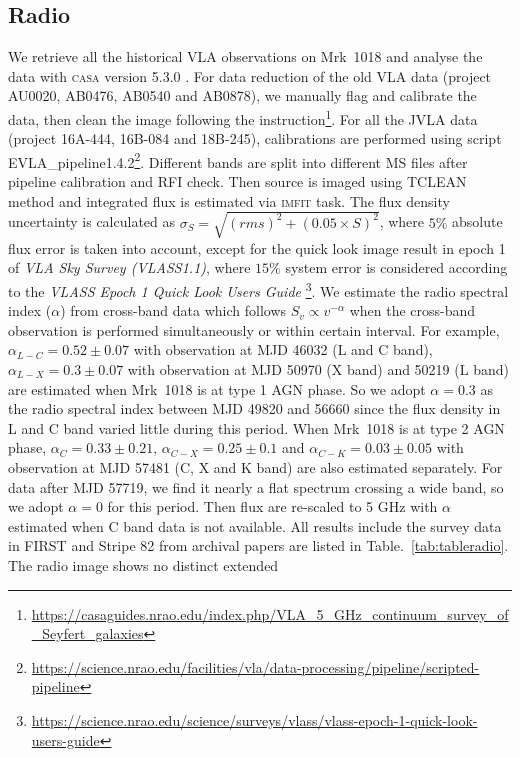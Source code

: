 \documentclass[twocolumn]{aastex63}
\begin{document}


\subsection{Radio}
\label{subsec:vla}
We retrieve all the historical VLA observations on Mrk~1018 and analyse the data with \textsc{casa} version 5.3.0 \citep{2007ASPC..376..127M}. For data reduction of the old VLA data (project AU0020, AB0476, AB0540 and AB0878), we manually flag and calibrate the data, then clean the image following the instruction\footnote{\url{https://casaguides.nrao.edu/index.php/VLA_5_GHz_continuum_survey_of_Seyfert_galaxies}}. For all the JVLA data (project 16A-444, 16B-084 and 18B-245), calibrations are performed using script {EVLA\_pipeline1.4.2}\footnote{\url{https://science.nrao.edu/facilities/vla/data-processing/pipeline/scripted-pipeline}}. Different bands are split into different MS files after pipeline calibration and RFI check. Then source is imaged using {\scriptsize TCLEAN} method and integrated flux is estimated via \textsc{imfit} task. The flux density uncertainty is calculated as $\sigma_{S}=\sqrt{(rms)^2+(0.05\times S)^2}$, where $5 \%$ absolute flux error is taken into account, except for the quick look image result in epoch 1 of  {\em VLA Sky Survey (VLASS1.1)}, where $15 \%$ system error is considered according to the {\em VLASS Epoch 1 Quick Look Users Guide} \footnote{\url{https://science.nrao.edu/science/surveys/vlass/vlass-epoch-1-quick-look-users-guide}}. We estimate the radio spectral index ($\alpha$) from cross-band data which follows $S_v \propto v^{-\alpha}$  when the cross-band observation is performed simultaneously or within certain interval. For example, $\alpha_{L-C} =0.52 \pm 0.07$ with observation at MJD 46032 (L and C band), $\alpha_{L-X} =0.3 \pm 0.07$ with observation at MJD 50970 (X band) and 50219 (L band) are estimated when Mrk~1018 is at type 1 AGN phase. So we adopt $\alpha=0.3$ as the radio spectral index between MJD 49820 and 56660 since the flux density in L and C band varied little during this period. When Mrk~1018 is at type 2 AGN phase, $\alpha_{C} =0.33\pm0.21$, $\alpha_{C-X} =0.25\pm0.1$ and $\alpha_{C-K} =0.03\pm0.05$ with observation at MJD 57481 (C, X and K band) are also estimated separately. For data after MJD 57719, we find it nearly a flat spectrum crossing a wide band, so we adopt $\alpha=0$ for this period. Then flux are re-scaled to 5 GHz with $\alpha$ estimated when C band data is not available.  All results include the survey data in FIRST\citep{1994ASPC...61..165B,1995ApJ...450..559B} and Stripe 82\citep{2011AJ....142....3H} from archival papers are listed in Table.~\ref{tab:tableradio}. The radio image shows no distinct extended 
\end{document}
